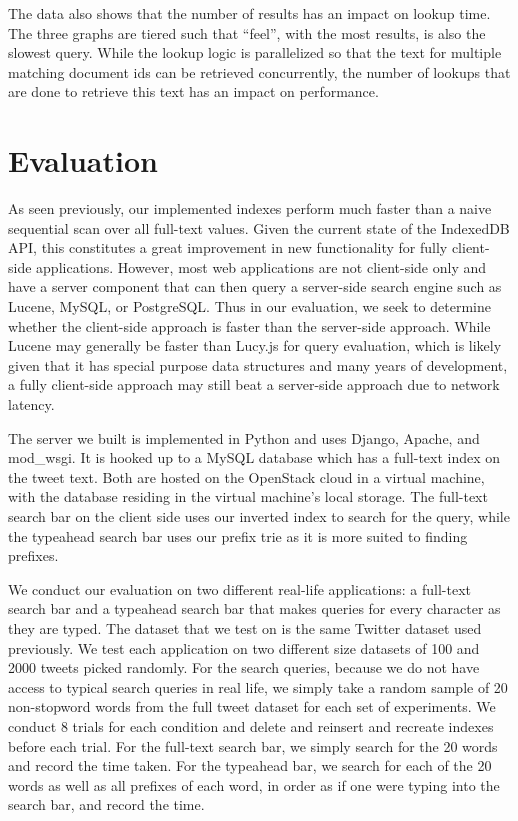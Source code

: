 \documentclass{vldb}
\begin{document}
The data also shows that the number of results has an  impact on lookup time. The three graphs are tiered such that ``feel'', with the most results, is also the slowest query. While the lookup logic is parallelized so that the text for multiple matching document ids can be retrieved concurrently, the number of lookups that are done to retrieve this text has an impact on performance.

\section{Evaluation}

As seen previously, our implemented indexes perform much faster than a naive sequential scan over all full-text values. Given the current state of the IndexedDB API, this constitutes a great improvement in new functionality for fully client-side applications. However, most web applications are not client-side only and have a server component that can then query a server-side search engine such as Lucene, MySQL, or PostgreSQL. Thus in our evaluation, we seek to determine whether the client-side approach is faster than the server-side approach. While Lucene may generally be faster than Lucy.js for query evaluation, which is likely given that it has special purpose data structures and many years of development, a fully client-side approach may still beat a server-side approach due to network latency. 

The server we built is implemented in Python and uses Django, Apache, and mod\_wsgi. It is hooked up to a MySQL database which has a full-text index on the tweet text. Both are hosted on the OpenStack cloud in a virtual machine, with the database residing in the virtual machine's local storage. The full-text search bar on the client side uses our inverted index to search for the query, while the typeahead search bar uses our prefix trie as it is more suited to finding prefixes.

We conduct our evaluation on two different real-life applications: a full-text search bar and a typeahead search bar that makes queries for every character as they are typed. The dataset that we test on is the same Twitter dataset used previously. We test each application on two different size datasets of 100 and 2000 tweets picked randomly. For the search queries, because we do not have access to typical search queries in real life, we simply take a random sample of 20 non-stopword words from the full tweet dataset for each set of experiments. We conduct 8 trials for each condition and delete and reinsert and recreate indexes before each trial. For the full-text search bar, we simply search for the 20 words and record the time taken. For the typeahead bar, we search for each of the 20 words as well as all prefixes of each word, in order as if one were typing into the search bar, and record the time. 
\end{document}
